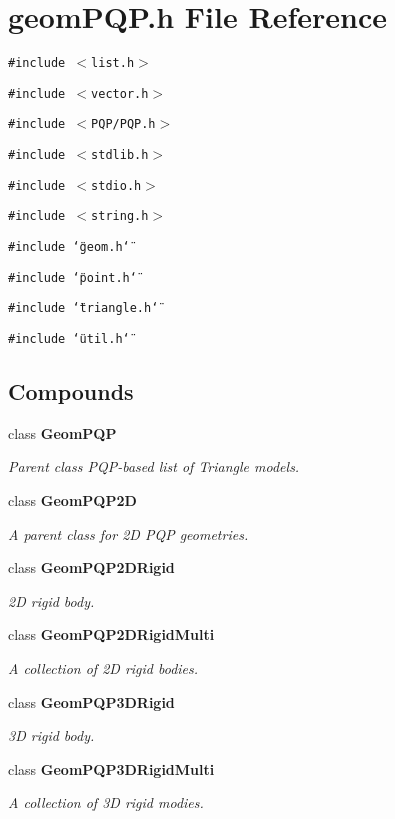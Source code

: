 \section{geom\-PQP.h File Reference}
\label{geomPQP_h}
{\tt \#include $<$list.h$>$}\par
{\tt \#include $<$vector.h$>$}\par
{\tt \#include $<$PQP/PQP.h$>$}\par
{\tt \#include $<$stdlib.h$>$}\par
{\tt \#include $<$stdio.h$>$}\par
{\tt \#include $<$string.h$>$}\par
{\tt \#include \char`\"{}geom.h\char`\"{}}\par
{\tt \#include \char`\"{}point.h\char`\"{}}\par
{\tt \#include \char`\"{}triangle.h\char`\"{}}\par
{\tt \#include \char`\"{}util.h\char`\"{}}\par
\subsection*{Compounds}
\begin{CompactItemize}
\item 
class {\bf Geom\-PQP}
\begin{CompactList}\small\item\em Parent class PQP-based list of Triangle models.\item\end{CompactList}\item 
class {\bf Geom\-PQP2D}
\begin{CompactList}\small\item\em A parent class for 2D PQP geometries.\item\end{CompactList}\item 
class {\bf Geom\-PQP2DRigid}
\begin{CompactList}\small\item\em 2D rigid body.\item\end{CompactList}\item 
class {\bf Geom\-PQP2DRigid\-Multi}
\begin{CompactList}\small\item\em A collection of 2D rigid bodies.\item\end{CompactList}\item 
class {\bf Geom\-PQP3DRigid}
\begin{CompactList}\small\item\em 3D rigid body.\item\end{CompactList}\item 
class {\bf Geom\-PQP3DRigid\-Multi}
\begin{CompactList}\small\item\em A collection of 3D rigid modies.\item\end{CompactList}\end{CompactItemize}
